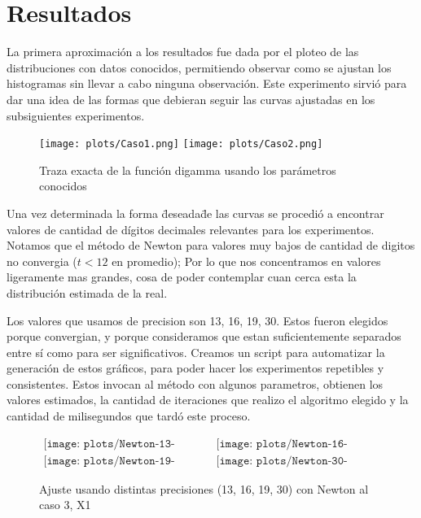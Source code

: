 \section{Resultados}


La primera aproximaci\'on a los resultados fue dada por el ploteo de las distribuciones con datos conocidos, permitiendo observar como se ajustan los histogramas sin llevar a cabo ninguna observaci\'on. Este experimento sirvi\'o para dar una idea de las formas que debieran seguir las curvas ajustadas en los subsiguientes experimentos.

\begin{figure} [H]
\begin {center}
\texttt{[image: plots/Caso1.png]}
\texttt{[image: plots/Caso2.png]}
\end {center}
\caption{Traza exacta de la funci\'on digamma usando los par\'ametros conocidos}
\label{fig:FitCaso3Newton}
\end{figure}

Una vez determinada la forma \"deseada\" de las curvas se procedi\'o a encontrar valores de cantidad de d\'igitos decimales relevantes para los experimentos. Notamos que el m\'etodo de Newton para valores muy bajos de cantidad de digitos no convergia ($t < 12$ en promedio); Por lo que nos concentramos en valores
ligeramente mas grandes, cosa de poder contemplar cuan cerca esta la distribuci\'on estimada de la real.

Los valores que usamos de precision son 13, 16, 19, 30. Estos fueron elegidos porque convergian, y porque consideramos que estan
suficientemente separados entre s\'i como para ser significativos. Creamos un script para automatizar la generaci\'on de estos gr\'aficos,
para poder hacer los experimentos repetibles y consistentes. Estos invocan al m\'etodo con algunos parametros, obtienen los
valores estimados, la cantidad de iteraciones que realizo el algoritmo elegido y la cantidad de milisegundos que tard\'o este proceso.


\begin{figure} [H]
$\begin{array}{cc}
\texttt{[image: plots/Newton-13-caso3.png]} &
\texttt{[image: plots/Newton-16-caso3.png]} \\
\texttt{[image: plots/Newton-19-caso3.png]} &
\texttt{[image: plots/Newton-30-caso3.png]}
\end{array}$
\caption{Ajuste usando distintas precisiones (13, 16, 19, 30) con Newton al caso 3, X1}
\label{fig:FitCaso3Newton}
\end{figure}

